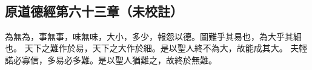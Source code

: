 ﻿%
%

\chapter{~}

\section{原道德經第六十三章（未校註）}

\begin{withgezhu}

\zhsong


為無為，事無事，味無味，大小，多少，報怨以德。圖難乎其易也，為大乎其細也。
天下之難作於易，天下之大作於細。是以聖人終不為大，故能成其大。
夫輕諾必寡信，多易必多難。是以聖人猶難之，故終於無難。

\end{withgezhu}
